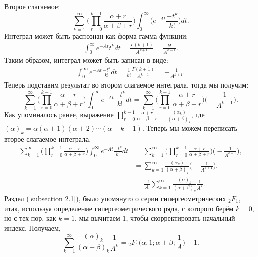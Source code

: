\documentclass[13pt]{article}
\begin{document}
Второе слагаемое:
\begin{equation*}
    \sum_{k=1}^{\infty}\Bigg( \prod_{r=0}^{k-1} \frac{\alpha + r}{\alpha + \beta + r}\Bigg) \int_{0}^{\infty}\Big( e^{-At}\frac{-t^{k}}{k!} \Big)dt. 
\end{equation*}
Интеграл может быть распознан как форма гамма-функции:
\begin{align*}
    \int_{0}^{\infty} e^{-At}t^{k}dt = \frac{\Gamma(k+1)}{A^{k+1}} = \frac{k!}{A^{k+1}}.
\end{align*}
Таким образом, интеграл может быть записан в виде:
\begin{align*}
   \int_{0}^{\infty} e^{-At}\frac{-t^{k}}{k!} dt =  \frac{1}{k!}\frac{\Gamma(k+1)}{A^{k+1}} = - \frac{1}{A^{k+1}}.
\end{align*}
Теперь подставим результат во втором слагаемое интеграла, тогда мы получим:
\begin{equation*}
    \sum_{k=1}^{\infty}\Bigg( \prod_{r=0}^{k-1} \frac{\alpha + r}{\alpha + \beta + r}\Bigg) \int_{0}^{\infty}e^{-At}\frac{-t^{k}}{k!}dt =  \sum_{k=1}^{\infty}\Bigg( \prod_{r=0}^{k-1} \frac{\alpha + r}{\alpha + \beta + r}\Bigg) \bigg( - \frac{1}{A^{k+1}} \bigg).
\end{equation*}
Как упоминалось ранее, выражение $\prod_{r=0}^{k-1}\frac{\alpha + r}{\alpha + \beta + r} = \frac{(\alpha_{k})}{(\alpha + \beta)_{k}}$, где $(\alpha)_{k} = \alpha(\alpha + 1)(\alpha + 2)\cdots(\alpha + k -1)$.
Теперь мы можем переписать второе слагаемое интеграла,
\begin{align*}
    \sum_{k=1}^{\infty}\Bigg( \prod_{r=0}^{k-1} \frac{\alpha + r}{\alpha + \beta + r}\Bigg) \int_{0}^{\infty}e^{-At}\frac{-t^{k}}{k!} dt &=  \sum_{k=1}^{\infty}\Bigg( \prod_{r=0}^{k-1} \frac{\alpha + r}{\alpha + \beta + r}\Bigg) \bigg( - \frac{1}{A^{k+1}} \bigg), \\
    &= \sum_{k=1}^{\infty} \frac{(\alpha_{k})}{(\alpha + \beta)_{k}} \bigg( - \frac{1}{A^{k+1}} \bigg), \\
    &= \frac{-1}{A}\sum_{k=1}^{\infty} \frac{(\alpha)_{k}}{(\alpha + \beta)_{k}}\frac{1}{A^{k}}.
\end{align*}
Раздел (\ref{subsection 2.1}), было упомянуто о серии гипергеометрических $_{2}F_{1}$, итак, используя определение гипергеометрического ряда, с которого берём $k=0$, но с тех пор, как $k=1$, мы вычитаем $1$, чтобы скорректировать начальный индекс. Получаем,
\begin{equation*}
    \sum_{k=1}^{\infty} \frac{(\alpha)_{k}}{(\alpha + \beta)_{k}}\frac{1}{A^{k}} = {_{2}F_{1}}\bigg(\alpha, 1; \alpha + \beta; \frac{1}{A}\bigg) - 1.
\end{equation*}
\end{document}
